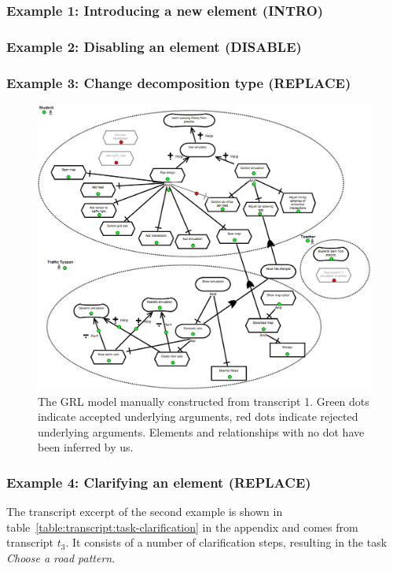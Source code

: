 \subsubsection{Example 1: Introducing a new element (INTRO)}


\subsubsection{Example 2: Disabling an element (DISABLE)}

\subsubsection{Example 3: Change decomposition type (REPLACE)}

\begin{figure}[h]
\includegraphics[width=\textwidth]{img/transcript_grl}
\caption{The GRL model manually constructed from transcript 1. Green dots indicate accepted underlying arguments, red dots indicate rejected underlying arguments. Elements and relationships with no dot have been inferred by us.}
\label{fig:transcripts:grl}
\end{figure}

\subsubsection{Example 4: Clarifying an element (REPLACE)}

The transcript excerpt of the second example is shown in table~\ref{table:transcript:task-clarification} in the appendix and comes from transcript $t_3$. It consists of a number of clarification steps, resulting in the task \emph{Choose a road pattern}. 

